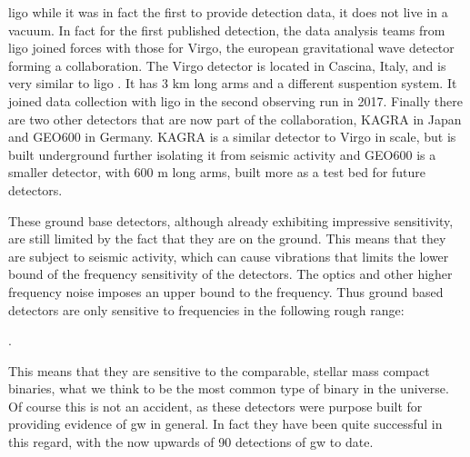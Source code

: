\documentclass[
  10pt,
  a4paper,
  DIV=11,
  numbers=noendperiod,
  twoside]{scrreprt}
\let\[\relax \let\]\relax %
\DeclareRobustCommand{\[}{\begin{equation}}
\DeclareRobustCommand{\]}{\end{equation}}
\begin{document}
\gls{ligo} while it was in fact the first to provide detection data, it
does not live in a vacuum. In fact for the first published detection,
the data analysis teams from \gls{ligo} joined forces with those for
Virgo, the european gravitational wave detector forming a collaboration.
The Virgo detector is located in Cascina, Italy, and is very similar to
\gls{ligo} . It has \(3\text{ km}\) long arms and a different suspention
system. It joined data collection with \gls{ligo} in the second
observing run in 2017. Finally there are two other detectors that are
now part of the collaboration, KAGRA in Japan and GEO600 in Germany.
KAGRA is a similar detector to Virgo in scale, but is built underground
further isolating it from seismic activity and GEO600 is a smaller
detector, with \(600 \text{ m}\) long arms, built more as a test bed for
future detectors.

These ground base detectors, although already exhibiting impressive
sensitivity, are still limited by the fact that they are on the ground.
This means that they are subject to seismic activity, which can cause
vibrations that limits the lower bound of the frequency sensitivity of
the detectors. The optics and other higher frequency noise imposes an
upper bound to the frequency. Thus ground based detectors are only
sensitive to frequencies in the following rough range:

\[
.
\]

This means that they are sensitive to the comparable, stellar mass
 compact
binaries, what we think to be the most common type of binary in the
universe. Of course this is not an accident, as these detectors were
purpose built for providing evidence of \gls{gw} in general. In fact
they have been quite successful in this regard, with the now upwards of
90 detections of \gls{gw} to date.
\end{document}

